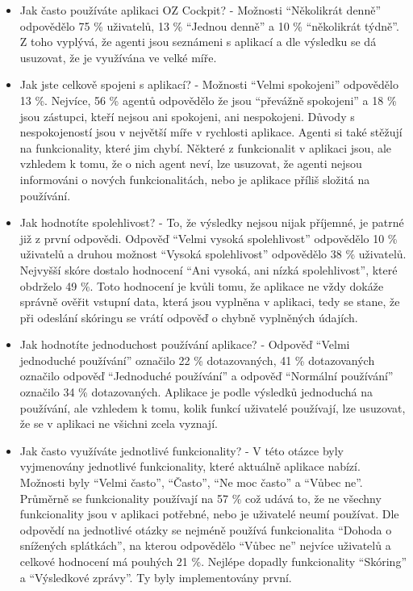 \documentclass[11pt,twoside,a4paper]{book}
\begin{document}
\begin{itemize}
\item Jak často používáte aplikaci OZ Cockpit? - Možnosti “Několikrát denně” odpovědělo 75 \% uživatelů, 13 \% “Jednou denně” a 10 \% “několikrát týdně”. Z toho vyplývá, že agenti jsou seznámeni s aplikací a dle výsledku se dá usuzovat, že je využívána ve velké míře.  
\item Jak jste celkově spojeni s aplikací? - Možnosti “Velmi spokojeni” odpovědělo 13 \%. Nejvíce, 56 \% agentů odpovědělo že jsou “převážně spokojeni” a 18 \% jsou zástupci, kteří nejsou ani spokojeni, ani nespokojeni. Důvody s nespokojeností jsou v největší míře v rychlosti aplikace. Agenti si také stěžují na funkcionality, které jim chybí. Některé z funkcionalit v aplikaci jsou, ale vzhledem k tomu, že o nich agent neví, lze usuzovat, že agenti nejsou informováni o nových funkcionalitách, nebo je aplikace příliš složitá na používání.
\item Jak hodnotíte spolehlivost? - To, že výsledky nejsou nijak příjemné, je patrné již z první odpovědi. Odpověď “Velmi vysoká spolehlivost” odpovědělo 10 \% uživatelů a druhou možnost “Vysoká spolehlivost” odpovědělo 38 \% uživatelů. Nejvyšší skóre dostalo hodnocení “Ani vysoká, ani nízká spolehlivost”, které obdrželo 49 \%. Toto hodnocení je kvůli tomu, že aplikace ne vždy dokáže správně ověřit vstupní data, která jsou vyplněna v aplikaci, tedy se stane, že při odeslání skóringu se vrátí odpověď o chybně vyplněných údajích.
\item Jak hodnotíte jednoduchost používání aplikace? - Odpověď “Velmi jednoduché používání” označilo 22 \% dotazovaných, 41 \% dotazovaných označilo odpověď “Jednoduché používání” a odpověď “Normální používání” označilo 34 \% dotazovaných. Aplikace je podle výsledků jednoduchá na používání, ale vzhledem k tomu, kolik funkcí uživatelé používají, lze usuzovat, že se v aplikaci ne všichni zcela vyznají.
\item Jak často využíváte jednotlivé funkcionality? - V této otázce byly vyjmenovány jednotlivé funkcionality, které aktuálně aplikace nabízí. Možnosti byly “Velmi často”, “Často”, “Ne moc často” a “Vůbec ne”. Průměrně se funkcionality používají na 57 \% což udává to, že ne všechny funkcionality jsou v aplikaci potřebné, nebo je uživatelé neumí používat. Dle odpovědí na jednotlivé otázky se nejméně používá funkcionalita “Dohoda o snížených splátkách”, na kterou odpovědělo “Vůbec ne” nejvíce uživatelů a celkové hodnocení má pouhých 21 \%. Nejlépe dopadly funkcionality “Skóring” a “Výsledkové zprávy”. Ty byly implementovány první. 

\end{itemize}
\end{document}

